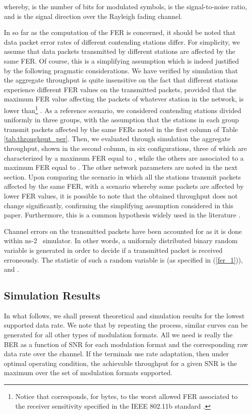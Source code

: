 \documentclass[10pt,onecolumn,a4paper]{IEEEtran}
\begin{document}
whereby,  is the number of bits for modulated symbols, 
is the signal-to-noise ratio, and  is the signal direction
over the Rayleigh fading channel.

In so far as the computation of the FER is concerned, it should be
noted that data packet error rates of different contending
stations differ. For simplicity, we assume that data packets
transmitted by different stations are affected by the same FER. Of
course, this is a simplifying assumption which is indeed justified
by the following pragmatic considerations. We have verified by
simulation that the aggregate throughput is quite insensitive on
the fact that different stations experience different FER values
on the transmitted packets, provided that the maximum FER value
affecting the packets of whatever station in the network, is lower
than\footnote{Notice that  corresponds, for
 bytes, to the worst allowed FER associated to the
receiver sensitivity specified in the IEEE 802.11b standard
\cite{standard_DCF_MAC}.} . As a reference
scenario, we considered  contending stations divided
uniformly in three groups, with the assumption that the stations
in each group transmit packets affected by the same FERs noted in
the first column of Table \ref{tab.throughput_per}. Then, we
evaluated through simulation the aggregate throughput, shown in
the second column, in six configurations, three of which are
characterized by a maximum FER equal to , while the
others are associated to a maximum FER equal to . The
other network parameters are noted in the next section. Upon
comparing the scenario in which all the stations transmit packets
affected by the same FER, with a scenario whereby some packets are
affected by lower FER values, it is possible to note that the
obtained throughput does not change significantly, confirming the
simplifying assumption considered in this paper. Furthermore, this
is a common hypothesis widely used in the literature
\cite{Chatzimisios}.

Channel errors on the transmitted packets have been accounted for
as it is done within ns-2~\cite{xiuchao} simulator. In other words, a
uniformly distributed binary random variable  is generated in
order to decide if a transmitted packet is received erroneously.
The statistic of such a random variable is  (as
specified in (\ref{fer_1})), and .
\subsection{Simulation Results}
In what follows, we shall present theoretical and simulation
results for the lowest supported data rate. We note that by
repeating the process, similar curves can be generated for all
other types of modulation formats. All we need is really the BER
as a function of SNR for each modulation format and the
corresponding raw data rate over the channel. If the terminals use
rate adaptation, then under optimal operating condition, the
achievable throughput for a given SNR is the maximum over the set
of modulation formats supported.
\end{document}
